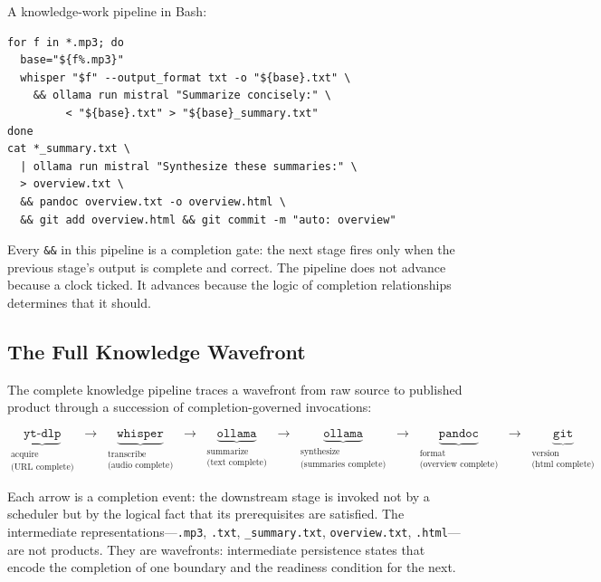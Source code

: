 \documentclass[12pt, a4paper]{article}
\begin{document}
A knowledge-work pipeline in Bash:

\begin{lstlisting}
for f in *.mp3; do
  base="${f%.mp3}"
  whisper "$f" --output_format txt -o "${base}.txt" \
    && ollama run mistral "Summarize concisely:" \
         < "${base}.txt" > "${base}_summary.txt"
done
cat *_summary.txt \
  | ollama run mistral "Synthesize these summaries:" \
  > overview.txt \
  && pandoc overview.txt -o overview.html \
  && git add overview.html && git commit -m "auto: overview"
\end{lstlisting}

Every \texttt{\&\&} in this pipeline is a completion gate: the next
stage fires only when the previous stage's output is complete and
correct. The pipeline does not advance because a clock ticked. It
advances because the logic of completion relationships determines that
it should.

\subsection{The Full Knowledge Wavefront}

The complete knowledge pipeline traces a wavefront from raw source
to published product through a succession of completion-governed
invocations:

\[
\underbrace{\texttt{yt-dlp}}_{\substack{\text{acquire}\\\text{(URL complete)}}}
\;\to\;
\underbrace{\texttt{whisper}}_{\substack{\text{transcribe}\\\text{(audio complete)}}}
\;\to\;
\underbrace{\texttt{ollama}}_{\substack{\text{summarize}\\\text{(text complete)}}}
\;\to\;
\underbrace{\texttt{ollama}}_{\substack{\text{synthesize}\\\text{(summaries complete)}}}
\;\to\;
\underbrace{\texttt{pandoc}}_{\substack{\text{format}\\\text{(overview complete)}}}
\;\to\;
\underbrace{\texttt{git}}_{\substack{\text{version}\\\text{(html complete)}}}
\]

Each arrow is a completion event: the downstream stage is invoked
not by a scheduler but by the logical fact that its prerequisites
are satisfied. The intermediate representations---\texttt{.mp3},
\texttt{.txt}, \texttt{\_summary.txt}, \texttt{overview.txt},
\texttt{.html}---are not products. They are wavefronts: intermediate
persistence states that encode the completion of one boundary and
the readiness condition for the next.
\end{document}
